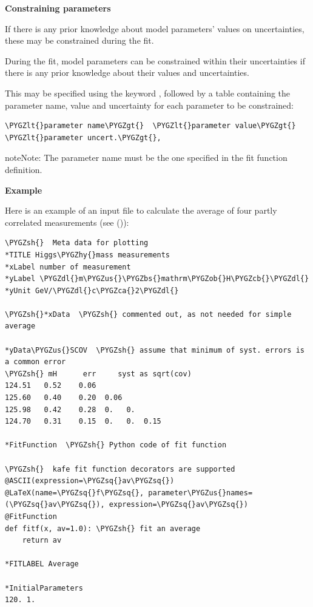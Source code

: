 \documentclass[a4paper,10pt,english]{sphinxmanual}
\def\PYGZbs{\char`\\}
\def\PYGZus{\char`\_}
\def\PYGZob{\char`\{}
\def\PYGZcb{\char`\}}
\def\PYGZca{\char`\^}
\def\PYGZlt{\char`\<}
\def\PYGZgt{\char`\>}
\def\PYGZsh{\char`\#}
\def\PYGZdl{\char`\$}
\def\PYGZhy{\char`\-}
\def\PYGZsq{\char`\'}
\renewcommand\PYGZsq{\textquotesingle}
\begin{document}
\begin{fulllineitems}
\textbf{Constraining parameters}

If there is any prior knowledge about model parameters' values on
uncertainties, these may be constrained during the fit.

During the fit, model parameters can be constrained within their
uncertainties if there is any prior knowledge about their values and
uncertainties.

This may be specified using the keyword , followed
by a table containing the parameter name, value and uncertainty for each parameter
to be constrained:

\begin{Verbatim}[commandchars=\\\{\}]
\PYGZlt{}parameter name\PYGZgt{}  \PYGZlt{}parameter value\PYGZgt{}  \PYGZlt{}parameter uncert.\PYGZgt{},
\end{Verbatim}

\begin{notice}{note}{Note:}
The parameter name must be the one specified in the fit function definition.
\end{notice}

\textbf{Example}

Here is an example of an input file to calculate the average of four
partly correlated measurements (see {\hyperref[examples:example-8]{\emph{}}} ()):

\begin{Verbatim}[commandchars=\\\{\}]
\PYGZsh{}  Meta data for plotting
*TITLE Higgs\PYGZhy{}mass measurements
*xLabel number of measurement
*yLabel \PYGZdl{}m\PYGZus{}\PYGZbs{}mathrm\PYGZob{}H\PYGZcb{}\PYGZdl{}
*yUnit GeV/\PYGZdl{}c\PYGZca{}2\PYGZdl{}

\PYGZsh{}*xData  \PYGZsh{} commented out, as not needed for simple average

*yData\PYGZus{}SCOV  \PYGZsh{} assume that minimum of syst. errors is a common error
\PYGZsh{} mH      err     syst as sqrt(cov)
124.51   0.52    0.06
125.60   0.40    0.20  0.06
125.98   0.42    0.28  0.   0.
124.70   0.31    0.15  0.   0.  0.15

*FitFunction  \PYGZsh{} Python code of fit function

\PYGZsh{}  kafe fit function decorators are supported
@ASCII(expression=\PYGZsq{}av\PYGZsq{})
@LaTeX(name=\PYGZsq{}f\PYGZsq{}, parameter\PYGZus{}names=(\PYGZsq{}av\PYGZsq{}), expression=\PYGZsq{}av\PYGZsq{})
@FitFunction
def fitf(x, av=1.0): \PYGZsh{} fit an average
    return av

*FITLABEL Average

*InitialParameters
120. 1.
\end{Verbatim}

\end{fulllineitems}
\end{document}
